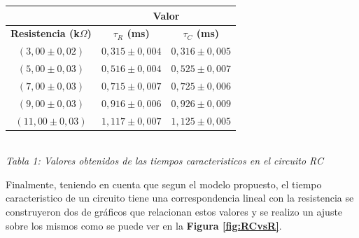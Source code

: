 \documentclass[11pt,a4paper]{article}
\begin{document}
\begin{center}
\begin{tabular}{||c|c|c||}
\hline
& \multicolumn{2}{c||}{\textbf{Valor}} \\ \hline
\textbf{Resistencia (k$\Omega$)} & \textbf{$\tau_{R}$ (ms)} & \textbf{$\tau_{C}$ (ms)} \\ \hline 
$(3,00\pm0,02)$ & $0,315 \pm 0,004$ & $0,316 \pm 0,005$ \\ \hline 
$(5,00\pm0,03)$ & $0,516\pm 0,004$ & $0,525 \pm 0,007$ \\ \hline 
$(7,00\pm0,03)$ & $0,715\pm 0,007$ & $0,725\pm 0,006$ \\ \hline 
$(9,00\pm0,03)$ & $0,916 \pm 0,006$ & $0,926 \pm 0,009$ \\ \hline 
$(11,00\pm0,03)$ & $1,117\pm 0,007$ & $1,125\pm 0,005$ \\ \hline 
\end{tabular}\\[0.3cm]
 
\textit{Tabla 1: Valores obtenidos de las tiempos caracteristicos en el circuito RC}
\end{center}

Finalmente, teniendo en cuenta que segun el modelo propuesto, el tiempo caracteristico de un circuito tiene una correspondencia lineal con la resistencia se construyeron dos de gráficos que relacionan estos valores y se realizo un ajuste sobre los mismos como se puede ver en la \textbf{Figura \ref{fig:RCvsR}}.
\end{document}
